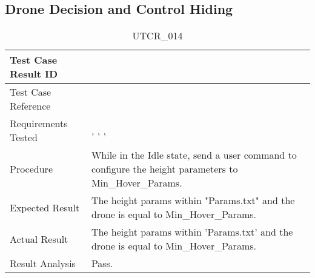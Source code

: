 \documentclass[12pt, titlepage]{article}
\begin{document}
\subsection{Drone Decision and Control Hiding}
\label{subsec:ddcHiding}

\begin{table}[!h]
\begin{center}
\caption {UTCR\_014}
\label{tab:UTCR_014}
\begin{tabular}{ | m{3.2cm} | m{12.2cm} | } 
\hline
Test Case Result ID & \nameref{tab:UTCR_014} \\ 
\hline
Test Case Reference & \nameref{tab:UTC_014}  \\ 
\hline
Requirements Tested & \nameref{STA_004}, \nameref{GEN_003}, \nameref{TRANS_003}, \nameref{TRANS_015} \\ 
\hline
Procedure & While in the Idle state, send a user command to configure the height parameters to Min\_Hover\_Params. \\ 
\hline
Expected Result & The height params within "Params.txt" and the drone is equal to Min\_Hover\_Params. \\
\hline
Actual Result & The height params within 'Params.txt' and the drone is equal to Min\_Hover\_Params. \\
\hline
Result Analysis & Pass. \\ 
\hline
\end{tabular}
\end{center}
\end{table}
\end{document}

